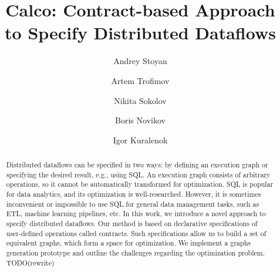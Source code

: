\documentclass[sigconf]{acmart}
\theoremstyle{remark}
\begin{document}

\title{Calco: Contract-based Approach \\to Specify Distributed Dataflows}

\author{Andrey Stoyan}

\author{Artem Trofimov}

\author{Nikita Sokolov}

\author{Boris Novikov}

\author{Igor Kuralenok}

\begin{abstract}
    Distributed dataflows can be specified in two ways: by defining an execution graph or specifying the desired result, e.g., using SQL.
    An execution graph consists of arbitrary operations, so it cannot be automatically transformed for optimization.
    SQL is popular for data analytics, and its optimization is well-researched.
    However, it is sometimes inconvenient or impossible to use SQL for general data management tasks, such as ETL, machine learning pipelines, etc.
    In this work, we introduce a novel approach to specify distributed dataflows.
    Our method is based on declarative specifications of user-defined operations called contracts.
    Such specifications allow us to build a set of equivalent graphs, which form a space for optimization.
    We implement a graphs generation prototype and outline the challenges regarding the optimization problem. TODO(rewrite)
\end{abstract}
\end{document}
